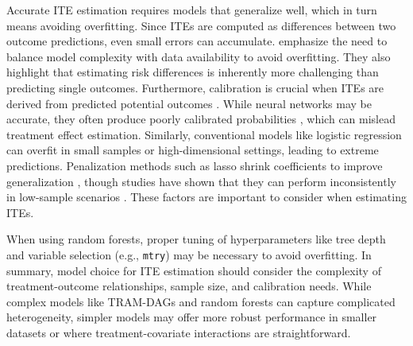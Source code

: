 Accurate ITE estimation requires models that generalize well, which in turn means avoiding overfitting. Since ITEs are computed as differences between two outcome predictions, even small errors can accumulate. \citet{hoogland2021} emphasize the need to balance model complexity with data availability to avoid overfitting. They also highlight that estimating risk differences is inherently more challenging than predicting single outcomes. Furthermore, calibration is crucial when ITEs are derived from predicted potential outcomes \citep{hoogland2024}. While neural networks may be accurate, they often produce poorly calibrated probabilities \citep{guo2017}, which can mislead treatment effect estimation. Similarly, conventional models like logistic regression can overfit in small samples or high-dimensional settings, leading to extreme predictions. Penalization methods such as lasso shrink coefficients to improve generalization \citep{riley2021}, though studies have shown that they can perform inconsistently in low-sample scenarios \citep{calster2020}. These factors are important to consider when estimating ITEs.


When using random forests, proper tuning of hyperparameters like tree depth and variable selection (e.g., \texttt{mtry}) may be necessary to avoid overfitting.
In summary, model choice for ITE estimation should consider the complexity of treatment-outcome relationships, sample size, and calibration needs. While complex models like TRAM-DAGs and random forests can capture complicated heterogeneity, simpler models may offer more robust performance in smaller datasets or where treatment-covariate interactions are straightforward.



